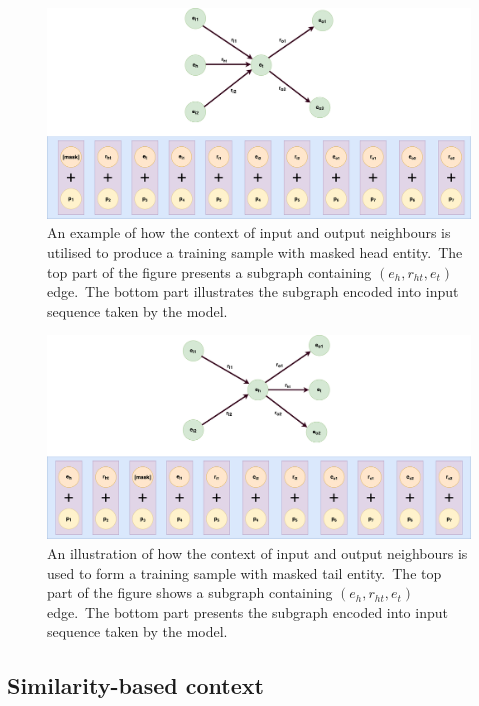 \documentclass[longabstract, english, mgr]{iithesis}
\theoremstyle{default_theorem_style}\newtheorem{theorem}{Theorem}
\theoremstyle{default_theorem_style}\newtheorem{definition}{Definition}
\begin{document}
\begin{figure}[h!]
\centering
\includegraphics[scale=0.2]{neighbours_based_model_input_variant}
\caption{An example of how the context of input and output neighbours is utilised to produce a training sample with
masked head entity.\ The top part of the figure presents a subgraph containing $(e_h, r_{ht}, e_t)$ edge.\ The bottom
part illustrates the subgraph encoded into input sequence taken by the model.}
\label{fig:neighbours_based_model_input_variant}
\end{figure}

\begin{figure}[h!]
\centering
\includegraphics[scale=0.2]{neighbours_based_model_output_variant}
\caption{An illustration of how the context of input and output neighbours is used to form a training sample with
masked tail entity.\ The top part of the figure shows a subgraph containing $(e_h, r_{ht}, e_t)$ edge.\ The bottom
part presents the subgraph encoded into input sequence taken by the model.}
\label{fig:neighbours_based_model_output_variant}
\end{figure}

\subsection{Similarity-based context}
\end{document}
